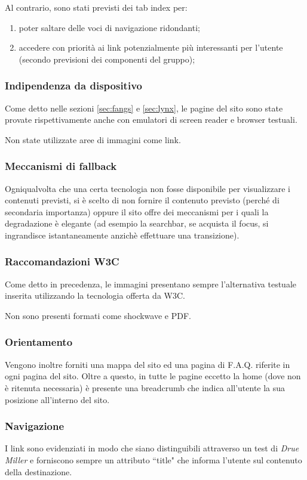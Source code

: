 Al contrario, sono stati previsti dei tab index per:
\begin{enumerate}
\item poter saltare delle voci di navigazione ridondanti;
\item accedere con priorità ai link potenzialmente più interessanti per
l'utente (secondo previsioni dei componenti del gruppo);
\end{enumerate}

\subsubsection{Indipendenza da dispositivo}
Come detto nelle sezioni \ref{sec:fangs} e \ref{sec:lynx}, le pagine del sito
sono state provate rispettivamente anche con emulatori di screen reader e
browser testuali.

Non state utilizzate aree di immagini come link.

\subsubsection{Meccanismi di fallback}
Ogniqualvolta che una certa tecnologia non fosse disponibile per visualizzare i
contenuti previsti, si è scelto di non fornire il contenuto previsto (perché
di secondaria importanza) oppure il sito offre dei meccanismi per i quali la
degradazione è elegante (ad esempio la searchbar, se acquista il focus, si
ingrandisce istantaneamente anzichè effettuare una transizione).

\subsubsection{Raccomandazioni W3C}
Come detto in precedenza, le immagini presentano sempre l'alternativa testuale
inserita utilizzando la tecnologia offerta da W3C.

Non sono presenti formati come shockwave e PDF.

\subsubsection{Orientamento}
Vengono inoltre forniti una mappa del sito ed una pagina di F.A.Q. riferite in
ogni pagina del sito. Oltre a questo, in tutte le pagine eccetto la home (dove
non è ritenuta necessaria) è presente una breadcrumb che indica all'utente la
sua posizione all'interno del sito.

\subsubsection{Navigazione} %
I link sono evidenziati in modo che siano distinguibili attraverso un test di \textit{Drue Miller} e forniscono sempre un attributo ``title" che informa
l'utente sul contenuto della destinazione.

